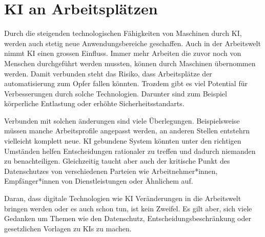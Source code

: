 \chapter{KI an Arbeitsplätzen}
\label{chap:ai-workingplaces}

Durch die steigenden technologischen Fähigkeiten von Maschinen durch KI, werden auch stetig neue Anwendungsbereiche geschaffen.
Auch in der Arbeitswelt nimmt KI einen grossen Einfluss. Immer mehr Arbeiten die zuvor noch von Menschen durchgeführt werden mussten, können durch Maschinen übernommen werden.
Damit verbunden steht das Risiko, dass Arbeitsplätze der automatisierung zum Opfer fallen könnten.
Trozdem gibt es viel Potential für Verbesserungen durch solche Technologien. Darunter sind zum Beispiel körperliche Entlastung oder erhöhte Sicherheitsstandarts.

Verbunden mit solchen änderungen sind viele Überlegungen. Beispielsweise müssen manche Arbeitsprofile angepasst werden, an anderen Stellen entstehrn vielleicht komplett neue.
KI gebundene System könnten unter den richtigen Umständen helfen Entscheidungen rationaler zu treffen und dadurch niemanden zu benachteiligen. 
Gleichzeitig taucht aber auch der kritische Punkt des Datenschutzes von verschiedenen Parteien wie Arbeitnehmer*innen, Empfänger*innen von Dienstleistungen oder Ähnlichem auf.

Daran, dass digitale Technologien wie KI Veränderungen in die Arbeitswelt bringen werden oder es auch schon tun, ist kein Zweifel.
Es gilt aber, sich viele Gedanken um Themen wie den Datenschutz, Entscheidungsbeschränkung oder gesetzlichen Vorlagen zu KIs zu machen.